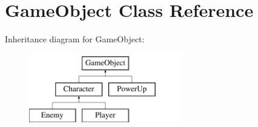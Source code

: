 \hypertarget{class_game_object}{}\section{Game\+Object Class Reference}
\label{class_game_object}
Inheritance diagram for Game\+Object\+:\begin{figure}[H]
\begin{center}
\leavevmode
\includegraphics[height=3.000000cm]{class_game_object}
\end{center}
\end{figure}
